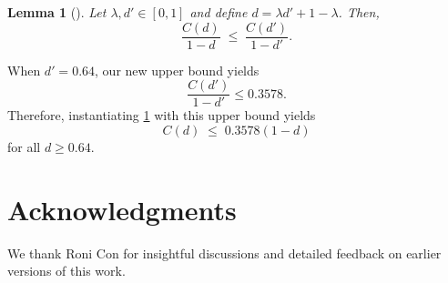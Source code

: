 \documentclass[11pt]{article}
\newtheorem{lemma}{Lemma}
\begin{document}
\begin{lemma}[{\cite{RD15}}]\label{lem:convex}
Let $\lambda, d' \in [0,1]$ and define $d = \lambda d' + 1 - \lambda$. Then,
\[
\frac{C(d)}{1-d} \;\leq\; \frac{C(d')}{1-d'}.
\]
\end{lemma}

When $d' = 0.64$, our new upper bound yields
\[
    \frac{C(d')}{1-d'} \leq 0.3578.
\]
Therefore, instantiating \cref{lem:convex} with this upper bound yields
\[
   C(d) \;\leq\; 0.3578 (1-d)
\]
for all $d \geq 0.64$.




\section*{Acknowledgments}

We thank Roni Con for insightful discussions and detailed feedback on earlier versions of this work.





\newpage
\end{document}
